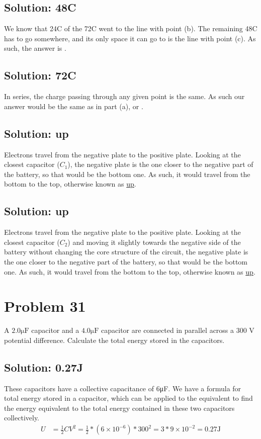 \documentclass[12pt]{article}
\begin{document}
\subsection{Solution: 48\textmu C}
We know that 24\textmu C of the 72\textmu C went to the line with point (b).
The remaining 48\textmu C has to go somewhere, and its only space it can go to is the line with point (c).
As such, the answer is \boxed{48 \unit{\micro\coulomb}}.

\subsection{Solution: 72\textmu C}
In series, the charge passing through any given point is the same. 
As such our answer would be the same as in part (a), or .

\subsection{Solution: up}
Electrons travel from the negative plate to the positive plate. 
Looking at the closest capacitor ($C_1$), the negative plate is the one closer to the negative part of the battery, so that would be the bottom one.
As such, it would travel from the bottom to the top, otherwise known as \underline{up}.

\subsection{Solution: up}
Electrons travel from the negative plate to the positive plate. 
Looking at the closest capacitor ($C_2$) and moving it slightly towards the negative side of the battery without changing the core structure of the circuit, the negative plate is the one closer to the negative part of the battery, so that would be the bottom one.
As such, it would travel from the bottom to the top, otherwise known as \underline{up}.

\pagebreak
\section{Problem 31}
A $2.0 \unit{\micro\farad}$ capacitor and a $4.0 \unit{\micro\farad}$ capacitor are connected in parallel across a 300 V potential difference.
Calculate the total energy stored in the capacitors.

\subsection*{Solution: 0.27J}
These capacitors have a collective capacitance of 6\unit{\micro\farad}. 
We have a formula for total energy stored in a capacitor, which can be applied to the equivalent to find the energy equivalent to the total energy contained in these two capacitors collectively.
\begin{align*}
    U   &=  \frac{1}{2}CV^2
        =   \frac{1}{2}*(6 \times 10^{-6})*300^2
        =   3 * 9 \times 10^{-2}
        =   \boxed{0.27 \unit{\joule}}
\end{align*}
\end{document}
